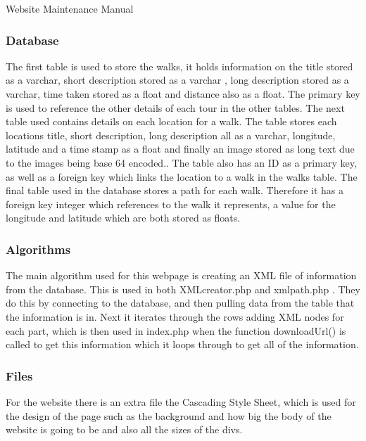 \documentclass{article}
\begin{document}
\begin{section}{Website Maintenance Manual}
		\subsubsection{Database}
		The first table is used to store the walks, it holds information on the title stored as a varchar, short description stored as a varchar , long description stored as a varchar, time taken stored as a float and distance also as a float. The primary key is used to reference the other details of each tour in the other tables. The next table used contains details on each location for a walk. The table stores each locations title, short description, long description all as a varchar, longitude, latitude and a time stamp as a float and finally an image stored as long text due to the images being base 64 encoded.. The table also has an ID as a primary key, as well as a foreign key which links the location to a walk in the walks table.
The final table used in the database stores a path for each walk. Therefore it has a foreign key integer which references to the walk it represents, a value for the longitude and latitude which are both stored as floats. 


		\subsubsection{Algorithms}
		The main algorithm used for this webpage is creating an XML file of information from the database. This is used in both XMLcreator.php and xmlpath.php . They do this by connecting to the database, and then pulling data from the table that the information is in. Next it iterates through the rows adding XML nodes for each part, which is then used in index.php when the function downloadUrl() is called to get this information which it loops through to get all of the information.


		\subsubsection{Files}
		For the website there is an extra file the Cascading Style Sheet, which is used for the design of the page such as the background and how big the body of the website is going to be and also all the sizes of the divs.


\end{section}
\end{document}
